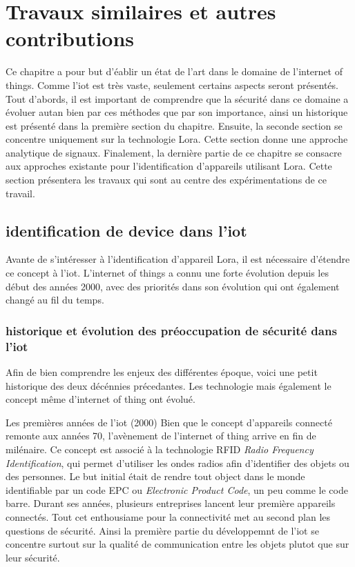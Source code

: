 \chapter{Travaux similaires et autres contributions}

Ce chapitre a pour but d'éablir un état de l'art dans le domaine de l'internet of things. Comme l'iot est très vaste, seulement certains aspects seront présentés. Tout d'abords, il est important de comprendre que la sécurité dans ce domaine a évoluer autan bien par ces méthodes que par son importance, ainsi un historique est présenté dans la première section du chapitre. Ensuite, la seconde section se concentre uniquement sur la technologie Lora. Cette section donne une approche analytique de signaux. Finalement, la dernière partie de ce chapitre se consacre aux approches existante pour l'identification d'appareils utilisant Lora. Cette section présentera les travaux qui sont au centre des expérimentations de ce travail.


\section{identification de device dans l'iot}

Avante de s'intéresser à l'identification d'appareil Lora, il est nécessaire d'étendre ce concept à l'iot. L'internet of things a connu une forte évolution depuis les début des années 2000, avec des priorités dans son évolution qui ont également changé au fil du temps.

\subsection{historique et évolution des préoccupation de sécurité dans l'iot}

Afin de bien comprendre les enjeux des différentes époque, voici une petit historique des deux décénnies précedantes. Les technologie mais également le concept même d'internet of thing ont évolué.

Les premières années de l'iot (2000)
Bien que le concept d'appareils connecté remonte aux années 70, l'avènement de l'internet of thing arrive en fin de milénaire. Ce concept est associé à la technologie RFID \textit{Radio Frequency Identification}, qui permet d'utiliser les ondes radios afin d'identifier des objets ou des personnes. Le but initial était de rendre tout object dans le monde identifiable par un code EPC ou \textit{Electronic Product Code}, un peu comme le code barre. Durant ses années, plusieurs entreprises lancent leur première appareils connectés. Tout cet enthousiame pour la connectivité met au second plan les questions de sécurité. Ainsi la première partie du développemnt de l'iot se concentre surtout sur la qualité de communication entre les objets plutot que sur leur sécurité.

